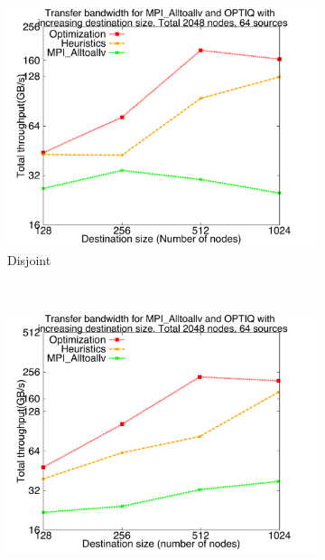 \begin{figure}[!htbp]
        \centering
        \begin{subfigure}[b]{0.32\textwidth}
                \includegraphics[width=\textwidth]{figures/incrsize_disjoint.pdf}
                \caption{Disjoint}
                \label{fig:incrsize_disjoint}
        \end{subfigure}%
        ~ %
        \begin{subfigure}[b]{0.32\textwidth}
                \includegraphics[width=\textwidth]{figures/incrsize_overlap}

\end{subfigure}
\end{figure}
